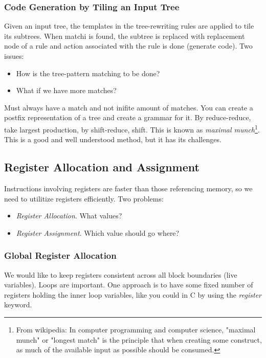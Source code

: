 \documentclass{article}
\begin{document}
\subsubsection{Code Generation by Tiling an Input Tree} %
\label{ssub:Code Generation by Tiling an Input Tree}
Given an input tree, the templates in the tree-rewriting rules are applied to tile its subtrees. When matchi is found, the subtree is replaced with replacement node of a rule and action associated with the rule is done (generate code). Two issues:
\begin{itemize}
	\item How is the tree-pattern matching to be done?
	\item What if we have more matches?
\end{itemize}
Must always have a match and not inifite amount of matches. You can create a postfix representation of a tree and create a grammar for it. By reduce-reduce, take largest production, by shift-reduce, shift. This is known as \emph{maximal munch}\footnote{From wikipedia: In computer programming and computer science, "maximal munch" or "longest match" is the principle that when creating some construct, as much of the available input as possible should be consumed.}. This is a good and well understood method, but it has its challenges.


\subsection{Register Allocation and Assignment} %
\label{sub:Register Allocation and Assignment}
Instructions involving registers are faster than those referencing memory, so we need to utilitize registers efficiently. Two problems:
\begin{itemize}
	\item \emph{Register Allocation}. What values?
	\item \emph{Register Assignment}. Which value should go where?
\end{itemize}

\subsubsection{Global Register Allocation} %
\label{ssub:Global Register Allocation}
We would like to keep registers consistent across all block boundaries (live variables). Loops are important. One approach is to have some fixed number of registers holding the inner loop variables, like you could in C by using the \emph{register} keyword.
\end{document}
